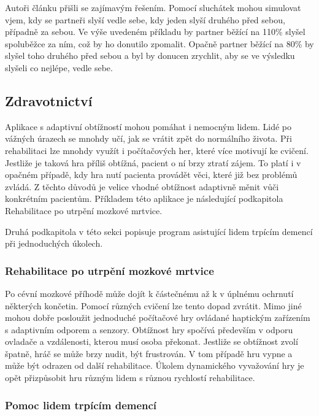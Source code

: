 Autoři článku přišli se zajímavým řešením. Pomocí sluchátek mohou simulovat vjem, kdy se partneři slyší vedle sebe, kdy jeden slyší druhého před sebou, případně za sebou. Ve výše uvedeném příkladu by partner běžící na 110\% slyšel spoluběžce za ním, což by ho donutilo zpomalit. Opačně partner běžící na 80\% by slyšel toho druhého před sebou a byl by donucen zrychlit, aby se ve výsledku slyšeli co nejlépe, vedle sebe.

\subsection{Zdravotnictví}

Aplikace s adaptivní obtížností mohou pomáhat i nemocným lidem. Lidé po vážných úrazech se mnohdy učí, jak se vrátit zpět do normálního života. Při rehabilitaci lze mnohdy využít i počítačových her, které více motivují ke cvičení. Jestliže je taková hra příliš obtížná, pacient o ní brzy ztratí zájem. To platí i v opačném případě, kdy hra nutí pacienta provádět věci, které již bez problémů zvládá. Z těchto důvodů je velice vhodné obtížnost adaptivně měnit vůči konkrétním pacientům. Příkladem této aplikace je následující podkapitola Rehabilitace po utrpění mozkové mrtvice.

Druhá podkapitola v této sekci popisuje program asistující lidem trpícím demencí při jednoduchých úkolech.

\subsubsection{Rehabilitace po utrpění mozkové mrtvice}

Po cévní mozkové příhodě může dojít k částečnému až k v úplnému ochrnutí některých končetin. Pomocí různých cvičení lze tento dopad zvrátit. Mimo jiné mohou dobře posloužit jednoduché počítačové hry ovládané haptickým zařízením s adaptivním odporem a senzory. Obtížnost hry spočívá především v odporu ovladače a vzdálenosti, kterou musí osoba překonat. Jestliže se obtížnost zvolí špatně, hráč se může brzy nudit, být frustrován. V tom případě hru vypne a může být odrazen od další rehabilitace. Úkolem dynamického vyvažování hry je opět přizpůsobit hru různým lidem s různou rychlostí rehabilitace\cite{9Pomdp}.  

\subsubsection{Pomoc lidem trpícím demencí}

